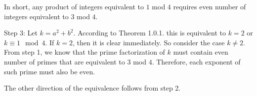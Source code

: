 \documentclass[a4paper]{article}
\theoremstyle{definition}
\begin{document}
In short, any product of integers equivalent to \(1\) mod \(4\) requires even number of integers equivalent to \(3\) mod \(4\).

\noindent Step 3: Let \(k = a^2 + b^2\). According to Theorem 1.0.1. this is equivalent to \(k = 2\) or \(k \equiv 1 \mod{4}\). If \(k = 2\), then it is clear immediately. So consider the case \(k \neq 2\). From step 1, we know that the prime factorization of \(k\) must contain even number of primes that are equivalent to \(3\) mod \(4\). Therefore, each exponent of such prime must also be even.

\noindent The other direction of the equivalence follows from step 2.
\end{document}
